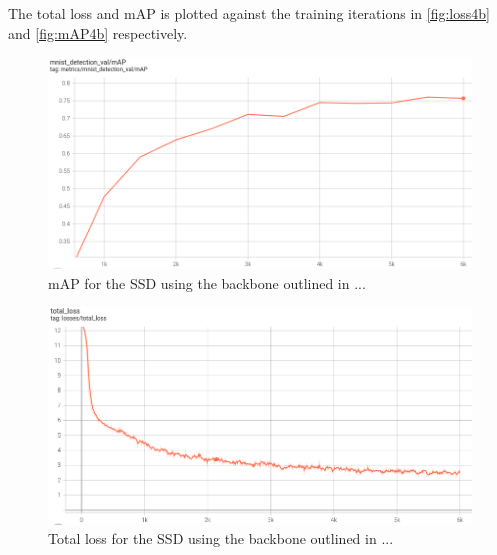 \documentclass{article}
\begin{document}
The total loss and mAP is plotted against the training iterations in \autoref{fig:loss4b} and \autoref{fig:mAP4b} respectively.

\begin{figure}[H]
    \centering
    \includegraphics[width=\textwidth]{Assignments/Assignment_4/plots/map_nonsmooth.png}
    \caption{mAP for the SSD using the backbone outlined in ...}
    \label{fig:mAP4b}
\end{figure}


\begin{figure}[H]
    \centering
    \includegraphics[width=\textwidth]{Assignments/Assignment_4/plots/tot_loss_full.png}
    \caption{Total loss for the SSD using the backbone outlined in ...}
    \label{fig:loss4b}
\end{figure}
\end{document}
